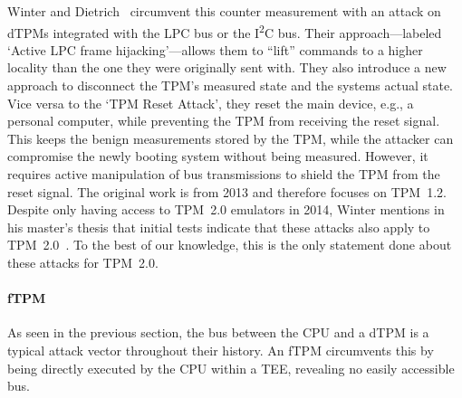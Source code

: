 Winter and Dietrich~\cite{Winter2013} circumvent this counter measurement with an attack on \acp{dTPM} integrated with the LPC bus or the I\textsuperscript{2}C bus.
Their approach---labeled `Active LPC frame hijacking'---allows them to ``lift'' commands to a higher locality than the one they were originally sent with.
They also introduce a new approach to disconnect the \ac{TPM}'s measured state and the systems actual state.
Vice versa to the `TPM Reset Attack', they reset the main device, e.g., a personal computer, while preventing the TPM from receiving the reset signal.
This keeps the benign measurements stored by the TPM, while the attacker can compromise the newly booting system without being measured.
However, it requires active manipulation of bus transmissions to shield the \ac{TPM} from the reset signal.
The original work is from 2013 and therefore focuses on TPM~1.2.
Despite only having access to TPM~2.0 emulators in 2014, Winter mentions in his master's thesis that initial tests indicate that these attacks also apply to TPM~2.0~\cite{winterMA2014}.
To the best of our knowledge, this is the only statement done about these attacks for TPM~2.0.



\paragraph{\Acl{fTPM}}

As seen in the previous section, the bus between the CPU and a \ac{dTPM} is a typical attack vector throughout their history.
An \ac{fTPM} circumvents this by being directly executed by the CPU within a \ac{TEE}, revealing no easily accessible bus.

